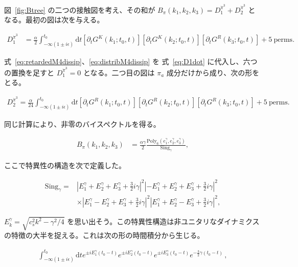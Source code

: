 \documentclass[a4paper,11pt]{ltjsarticle}
\numberwithin{equation}{section}
\def\pia{\pi_{a}}
\newcommand{\dd}{\mathrm{d}}
\newcommand{\ee}{e}
\newcommand{\Eq}[1]{Eq.~(\ref{#1})}
\newcommand{\Eqs}[1]{Eqs.~(\ref{#1})}
\newcommand{\Fig}[1]{Fig.~{\ref{#1}}}
\renewcommand{\Eq}[1]{式~\eqref{#1}}
\renewcommand{\Eqs}[1]{式~\eqref{#1}}
\renewcommand{\Fig}[1]{図~\ref{#1}}
\begin{document}
\Fig{fig:Btree} の二つの接触図を考え、その和が $B_\pi(k_1,k_2,k_3)=D^{\dot{\pi}^3}_1+D^{\dot{\pi}^3}_2$ となる。最初の図は次を与える。

\begin{align}\label{eq:D1dot}
D^{\dot{\pi}^3}_1 &=  \frac{\alpha}{2} \int_{-\infty(1\pm i \epsilon)}^{t_0} \dd t \left[\partial_t G^K(k_1; t_0,t)\right] \left[\partial_t G^K(k_2; t_0,t)\right] \left[\partial_tG^R(k_3; t_0,t)\right] + 5~\mathrm{perms}. 
\end{align}

\Eqs{eq:retardedM4dissip}、\eqref{eq:distribM4dissip} を \Eq{eq:D1dot} に代入し、六つの置換を足すと $D^{\dot{\pi}^3}_1=0$ となる。二つ目の図は $\pia$ 成分だけから成り、次の形をとる。

\begin{align}\label{eq:D2dissip}
D^{\dot{\pi}^3}_2 = \frac{\alpha}{24} \int_{-\infty(1\pm i \epsilon)}^{t_0} \dd t \left[\partial_t G^R(k_1; t_0,t) \right] \left[\partial_t G^R(k_2; t_0,t)\right] \left[ \partial_t G^R(k_3; t_0,t)\right] + 5~\mathrm{perms}.
\end{align}

同じ計算により、非零のバイスペクトルを得る。

\begin{align}\label{eq:D2resultdissip}
 B_\pi(k_1,k_2,k_3) &=  \frac{\alpha \gamma}{2} \frac{  \mathrm{Poly}_6\left(e_1^\gamma, e_2^\gamma,e_3^\gamma \right)}{ \mathrm{Sing}_\gamma} ,
\end{align}

ここで特異性の構造を次で定義した。

\begin{align}\label{eq:singdissip}
 \mathrm{Sing}_\gamma =& \left| E_1^{\gamma} + E_2^{\gamma} + E_3^{\gamma} + \frac{3}{2}i \gamma\right|^2 \left| -E_1^{\gamma} + E_2^{\gamma} + E_3^{\gamma} + \frac{3}{2}i \gamma\right|^2 \nonumber\\
 &\times \left| E_1^{\gamma} - E_2^{\gamma} + E_3^{\gamma} + \frac{3}{2}i \gamma\right|^2 \left| E_1^{\gamma} + E_2^{\gamma} - E_3^{\gamma} + \frac{3}{2}i \gamma\right|^2, 
\end{align}

$E_k^\gamma=\sqrt{c_s^2k^2-\gamma^2/4}$ を思い出そう。この特異性構造は非ユニタリなダイナミクスの特徴の大半を捉える。これは次の形の時間積分から生じる。

\begin{align}\label{eq:M4int}
\int_{-\infty(1\pm i \epsilon)}^{t_0} \dd t \ee^{ \pm i E_1^{\gamma} (t_0 - t) } \ee^{\pm i E_2^{\gamma} (t_0 - t) } \ee^{\pm i E_3^{\gamma} (t_0 - t) } \ee^{- \frac{3}{2}\gamma(t_0-t)}\,,
\end{align}
\end{document}
